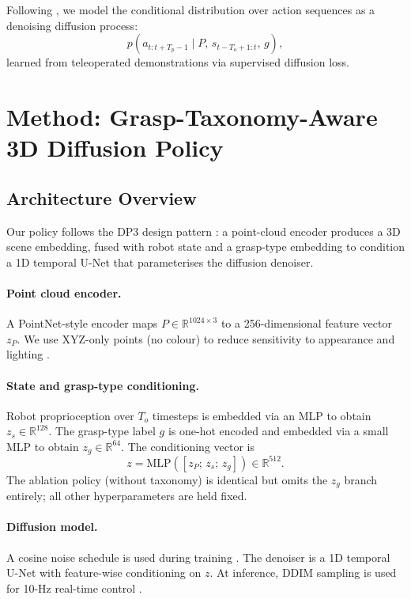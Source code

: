 \documentclass[11pt]{article}
\begin{document}
Following \citet{chi2023diffusionpolicy}, we model the conditional distribution over
action sequences as a denoising diffusion process:
\[
p\!\left(a_{t:t+T_p-1} \mid P,\, s_{t-T_o+1:t},\, g\right),
\]
learned from teleoperated demonstrations via supervised diffusion loss.

\section{Method: Grasp-Taxonomy-Aware 3D Diffusion Policy}
\subsection{Architecture Overview}
Our policy follows the DP3 design pattern \citep{ze2024dp3}: a point-cloud encoder
produces a 3D scene embedding, fused with robot state and a grasp-type embedding to
condition a 1D temporal U-Net that parameterises the diffusion denoiser.

\paragraph{Point cloud encoder.}
A PointNet-style encoder \citep{qi2017pointnet} maps $P \in \mathbb{R}^{1024 \times 3}$
to a 256-dimensional feature vector $z_P$. We use XYZ-only points (no colour) to reduce
sensitivity to appearance and lighting \citep{ze2024dp3}.

\paragraph{State and grasp-type conditioning.}
Robot proprioception over $T_o$ timesteps is embedded via an MLP to obtain $z_s \in
\mathbb{R}^{128}$. The grasp-type label $g$ is one-hot encoded and embedded via a small
MLP to obtain $z_g \in \mathbb{R}^{64}$. The conditioning vector is
\[
z = \mathrm{MLP}\!\left([z_P;\, z_s;\, z_g]\right) \in \mathbb{R}^{512}.
\]
The ablation policy (without taxonomy) is identical but omits the $z_g$ branch entirely;
all other hyperparameters are held fixed.

\paragraph{Diffusion model.}
A cosine noise schedule is used during training \citep{chi2023diffusionpolicy}. The
denoiser is a 1D temporal U-Net with feature-wise conditioning on $z$. At inference,
DDIM sampling is used for 10-Hz real-time control \citep{song2021ddim}.
\end{document}

